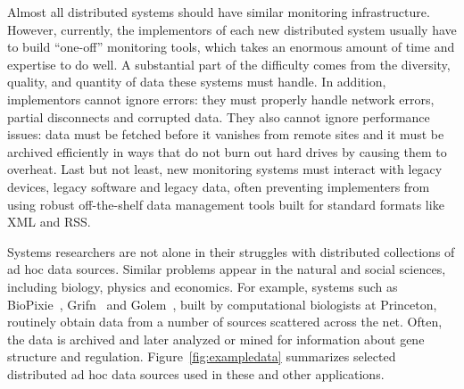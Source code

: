 Almost all distributed systems should have similar
monitoring infrastructure.  However, currently, the implementors of each new
distributed system usually have to build ``one-off'' monitoring tools,
which takes an enormous amount of time and expertise to do well.  A
substantial part of the difficulty comes from the diversity, quality,
and quantity of data these systems must handle.  In addition,
implementors cannot ignore errors: they must properly handle network 
errors, partial disconnects and corrupted data.  They also cannot ignore 
performance issues:
data must be fetched before it vanishes from remote sites and it must
be archived efficiently in ways that do not burn out hard drives by
causing them to overheat.  Last but not least, new monitoring systems 
must interact with legacy devices, legacy software and legacy data,
often preventing implementers from using robust off-the-shelf data management
tools built for standard formats like XML and RSS. 

Systems researchers are not alone in their struggles with distributed
collections of ad hoc data sources.
Similar problems appear in the natural and social sciences,
including biology, physics and economics.  For example, systems such
as BioPixie~\cite{biopixie}, Grifn~\cite{grifn} and
Golem~\cite{golem}, built by computational biologists at Princeton,
routinely obtain data from a number of sources scattered
across the net.  Often, the data is archived and later analyzed or
mined for information about gene structure and regulation.
Figure~\ref{fig:exampledata} summarizes 
selected distributed ad hoc data sources used in these and other
applications.


